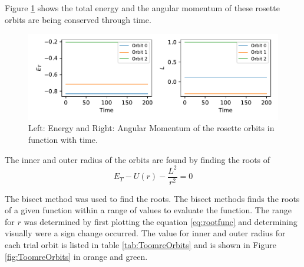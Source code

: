 Figure \ref{fig:conservedQuants} shows the total energy and the angular momentum of these rosette orbits are being conserved through time. 
\begin{figure}[h]
    \centering
    \includegraphics{CodeAndFigures/EnergyMomentumPlot.pdf}
    \caption{Left: Energy and Right: Angular Momentum of the rosette orbits in function with time.}
    \label{fig:conservedQuants}
\end{figure}

The inner and outer radius of the orbits are found by finding the roots of
\begin{equation}
    E_T - U(r) - \frac{L^2}{r^2} = 0
    \label{eq:rootfunc}
\end{equation}

The bisect method was used to find the roots. The bisect methods finds the roots of a given function within a range of values to evaluate the function. The range for $r$ was determined by first plotting the equation \ref{eq:rootfunc} and determining visually were a sign change occurred. The value for inner and outer radius for each trial orbit is listed in table \ref{tab:ToomreOrbits} and is shown in Figure \ref{fig:ToomreOrbits} in orange and green. 




